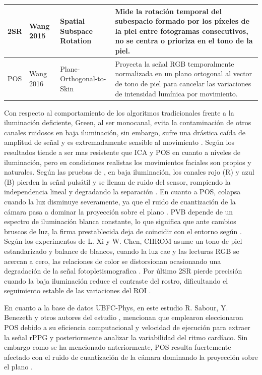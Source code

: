 \begin{table}[htbp]
\begin{tabular}{|p{2.5cm}|p{2.3cm}|p{3.2cm}|p{4.8cm}|}
        2SR                &  Wang 2015         & Spatial Subspace Rotation & Mide la rotación temporal del subespacio formado por los píxeles de la piel entre fotogramas consecutivos, no se centra o prioriza en el tono de la piel.  \cite{gupta2023privacy_pres, odinaev2024robust}   \\ \hline
        POS                &  Wang 2016         & Plane-Orthogonal-to-Skin  & Proyecta la señal RGB temporalmente normalizada en un plano ortogonal al vector de tono de piel para cancelar las variaciones de intensidad lumínica por movimiento. \cite{transphys2023, debnath2026advanced_signal, cho2025dualbranch, sabour2023ubfcphys}  \\ \hline
    \end{tabular}
\end{table}

\newpage

Con respecto al comportamiento de los algoritmos tradicionales frente a la iluminación deficiente, Green, al ser monocanal, evita la contaminación de otros canales 
ruidosos en baja iluminación, sin embargo, sufre una drástica caída de amplitud de señal y es extremadamente sensible al movimiento \cite{yang2022image_en}.
Según los resultados tiende a ser mas resistente que ICA y POS en cuanto a niveles de iluminación, pero en condiciones realistas los movimientos faciales son
propios y naturales. Según las pruebas de \cite{yang2022image_en}, en baja iluminación, los canales rojo (R) y azul (B) pierden la señal pulsátil y se 
llenan de ruido del sensor, rompiendo la independencia lineal y degradando la separación \cite{xi2022weighted}. En cuanto a POS, colapsa cuando la luz 
disminuye severamente, ya que el ruido de cuantización de la cámara pasa a dominar la proyección sobre el plano \cite{yang2022image_en, xi2022weighted}. PVB 
depende de un espectro de iluminación blanca constante, lo que significa que ante cambios bruscos de luz, la firma prestablecida deja de coincidir con el 
entorno según \cite{xu2023ivrrppg}. Según los experimentos de L. Xi y W. Chen, CHROM asume un tono de piel estandarizado y balance de blancos, cuando la 
luz cae y las lecturas RGB se acercan a cero, las relaciones de color se distorsionan ocasionando una degradación de la señal fotopletismografica \cite{yang2022image_en}.
Por último 2SR pierde precisión cuando la baja iluminación reduce el contraste del rostro, dificultando el seguimiento estable de las variaciones del 
ROI \cite{gupta2023privacy_pres, odinaev2024robust}.

En cuanto a la base de datos UBFC-Phys, en este estudio R. Sabour, Y. Benezeth y otros autores del estudio \cite{sabour2023ubfcphys}, mencionan que emplearon
eleccionaron POS debido a su eficiencia computacional y velocidad de ejecución para extraer la señal rPPG y posteriormente analizar la variabilidad del ritmo cardíaco.
Sin embargo como se ha mencionado anteriormente, POS resulta fuertemente afectado con el ruido de cuantización de la cámara dominando la proyección sobre el plano \cite{yang2022image_en, xi2022weighted}.

